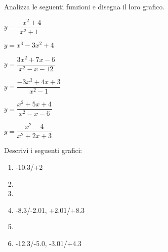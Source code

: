 \begin{esercizio}\label{ese:stufun.4e}
Analizza le seguenti funzioni e disegna il loro grafico.
\begin{multicols}{3}
 \begin{enumeratea}
  \item \(y = \dfrac{-x^2 +4}{x^2 +1}\) \\ [.5em] %
  \item \(y = x^3 -3x^2 +4\) %
  \item \(y = \dfrac{3x^2 +7x -6}{x^2 -x -12}\) \\ %
  \item \(y = \dfrac{-3x^3 +4x +3}{x^2 -1}\) %
  \item \(y = \dfrac{x^2+5x+4}{x^2-x-6}\) \\ %
  \item \(y = \dfrac{x^2 -4}{x^2 +2x +3}\) %
 \end{enumeratea}
\end{multicols}
\end{esercizio}

\bigskip

\bigskip

\begin{esercizio}\label{ese:stufun.4g}
Descrivi i seguenti grafici:
\begin{multicols}{2}
 \begin{enumerate} [left=0pt, label=\alph*)]
  \item \myp 
{}
{-10.3/+2} %
  \item \myp 
{} %
  \item \myp 
{}%
\vspace{1mm}
  \item \myp 
{}
{-8.3/-2.01, +2.01/+8.3} %
  \item \myp 
{} %
\item \myp 
{}
{-12.3/-5.0, -3.01/+4.3} %
 \end{enumerate}
\end{multicols}
\end{esercizio}

